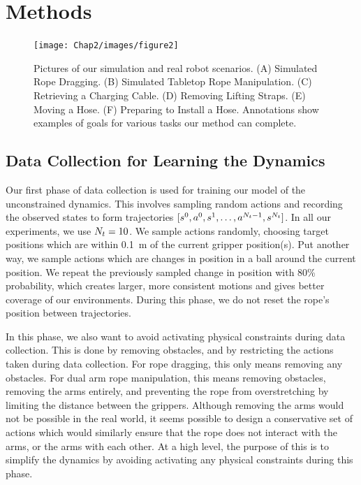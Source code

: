 \section{Methods} \label{SciRob:sec:methods}

\begin{figure}
    \centering
    \texttt{[image: Chap2/images/figure2]}
    \caption{Pictures of our simulation and real robot scenarios. (A) Simulated Rope Dragging. (B) Simulated Tabletop Rope Manipulation. (C) Retrieving a Charging Cable. (D) Removing Lifting Straps. (E) Moving a Hose. (F) Preparing to Install a Hose. Annotations show examples of goals for various tasks our method can complete.}
    \label{Scirob:fig:figure2}
\end{figure}


\subsection{Data Collection for Learning the Dynamics}

\label{Scirob:sec:phase_one_collection}
Our first phase of data collection is used for training our model of the unconstrained dynamics. This involves sampling random actions and recording the observed states to form trajectories $[s^0,a^0,s^1,\dots,a^{N_{t}-1},s^{N_{t}}]$. In all our experiments, we use $N_{t}=10$. We sample actions randomly, choosing target positions which are within \SI{0.1}{\meter} of the current gripper position(s). Put another way, we sample actions which are changes in position in a ball around the current position. We repeat the previously sampled change in position with 80\% probability, which creates larger, more consistent motions and gives better coverage of our environments. During this phase, we do not reset the rope's position between trajectories.

In this phase, we also want to avoid activating physical constraints during data collection. This is done by removing obstacles, and by restricting the actions taken during data collection. For rope dragging, this only means removing any obstacles. For dual arm rope manipulation, this means removing obstacles, removing the arms entirely, and preventing the rope from overstretching by limiting the distance between the grippers. Although removing the arms would not be possible in the real world, it seems possible to design a conservative set of actions which would similarly ensure that the rope does not interact with the arms, or the arms with each other. At a high level, the purpose of this is to simplify the dynamics by avoiding activating any physical constraints during this phase.

